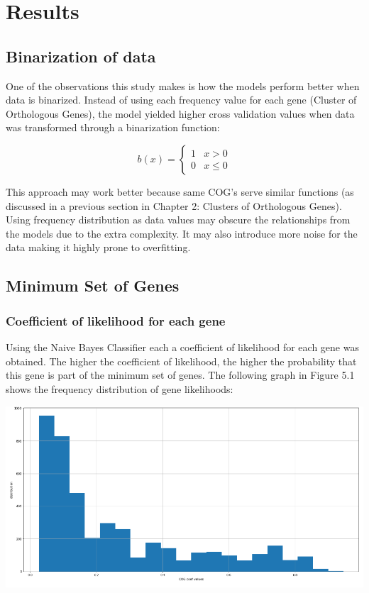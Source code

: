 \documentclass[]{report}
\begin{document}
\chapter{Results}\label{results}

\section{Binarization of data}\label{binarization-of-data}

One of the observations this study makes is how the models perform
better when data is binarized. Instead of using each frequency value for
each gene (Cluster of Orthologous Genes), the model yielded higher cross
validation values when data was transformed through a binarization
function:

\begin{equation}
b(x) = \left\{\begin{matrix}
1 &{x>0} \\
0 & {x\leq 0}
\end{matrix}\right.
\end{equation}

This approach may work better because same COG's serve similar functions
(as discussed in a previous section in Chapter 2: Clusters of
Orthologous Genes). Using frequency distribution as data values may
obscure the relationships from the models due to the extra complexity.
It may also introduce more noise for the data making it highly prone to
overfitting.

\section{Minimum Set of Genes}\label{minimum-set-of-genes}

\subsection{Coefficient of likelihood for each
gene}\label{coefficient-of-likelihood-for-each-gene}

Using the Naive Bayes Classifier each a coefficient of likelihood for
each gene was obtained. The higher the coefficient of likelihood, the
higher the probability that this gene is part of the minimum set of
genes. The following graph in Figure 5.1 shows the frequency
distribution of gene likelihoods:

\includegraphics{./tex2pdf.9716/0ac99d6c6548095e4d165eb01da5a9dcc121c8fc.png}
\end{document}

